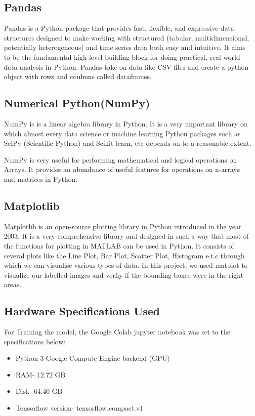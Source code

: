 \documentclass[12pt]{report}
\begin{document}
\subsection{Pandas}
Pandas is a Python package that provides fast, flexible, and expressive data structures designed to make working with structured (tabular, multidimensional, potentially heterogeneous) and time series data both easy and intuitive. It aims to be the fundamental high-level building block for doing practical, real world data analysis in Python\cite{Pandas}.
Pandas take on data like CSV files  and create a python object with rows and coulmns called dataframes.

\subsection{Numerical Python(NumPy)}
NumPy is is a linear algebra library in Python. It is a very important library on which almost every data science or machine learning Python packages such as SciPy (Scientific Python) and Scikit-learn, etc depends on to a reasonable extent.

NumPy is very useful for performing mathematical and logical operations on Arrays. It provides an abundance of useful features for operations on n-arrays and matrices in Python\cite{Num}.

\subsection{Matplotlib}
Matplotlib is an open-source plotting library in Python introduced in the year 2003. It is a very comprehensive library and designed in such a way that most of the functions for plotting in MATLAB can be used in Python.
It consists of several plots like the Line Plot, Bar Plot, Scatter Plot, Histogram e.t.c through which we can visualise various types of data.
In this project, we used matplot to visualize our labelled images and verfiy if the bounding boxes were in the right areas\cite{Mat}.

\subsection{Hardware Specifications Used}
For Training the model, the Google Colab jupyter notebook was set to the specifications below:

\begin{itemize}[topsep=0pt]

\item Python 3 Google Compute Engine backend (GPU)

\item RAM- 12.72 GB 

\item Disk -64.40 GB

\item Tensorflow version- tensorflow.compact.v1

\end{itemize}
\end{document}
